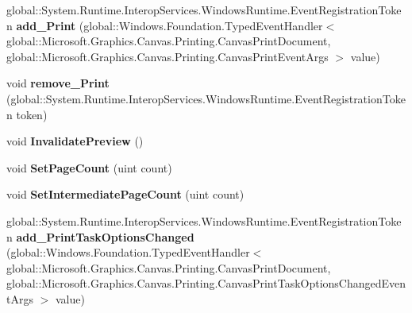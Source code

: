 \begin{DoxyCompactItemize}
\item 
\mbox{\label{interface_microsoft_1_1_graphics_1_1_canvas_1_1_printing_1_1_i_canvas_print_document_a4a78f4b715e692c620d4548df21d5ac0}} 
global\+::\+System.\+Runtime.\+Interop\+Services.\+Windows\+Runtime.\+Event\+Registration\+Token {\bfseries add\+\_\+\+Print} (global\+::\+Windows.\+Foundation.\+Typed\+Event\+Handler$<$ global\+::\+Microsoft.\+Graphics.\+Canvas.\+Printing.\+Canvas\+Print\+Document, global\+::\+Microsoft.\+Graphics.\+Canvas.\+Printing.\+Canvas\+Print\+Event\+Args $>$ value)
\item 
\mbox{\label{interface_microsoft_1_1_graphics_1_1_canvas_1_1_printing_1_1_i_canvas_print_document_a6c6e9590103da951592e47820ae53fdb}} 
void {\bfseries remove\+\_\+\+Print} (global\+::\+System.\+Runtime.\+Interop\+Services.\+Windows\+Runtime.\+Event\+Registration\+Token token)
\item 
\mbox{\label{interface_microsoft_1_1_graphics_1_1_canvas_1_1_printing_1_1_i_canvas_print_document_a6624a11a39bdacc1332f7370fe4e289a}} 
void {\bfseries Invalidate\+Preview} ()
\item 
\mbox{\label{interface_microsoft_1_1_graphics_1_1_canvas_1_1_printing_1_1_i_canvas_print_document_a27ce0b5fa1108240d85779236c1ab571}} 
void {\bfseries Set\+Page\+Count} (uint count)
\item 
\mbox{\label{interface_microsoft_1_1_graphics_1_1_canvas_1_1_printing_1_1_i_canvas_print_document_a7f760cb71cc746fd247a12e55ba416a1}} 
void {\bfseries Set\+Intermediate\+Page\+Count} (uint count)
\item 
\mbox{\label{interface_microsoft_1_1_graphics_1_1_canvas_1_1_printing_1_1_i_canvas_print_document_a1de4b2e4a0bbe65d5a50f8cfd5b275ff}} 
global\+::\+System.\+Runtime.\+Interop\+Services.\+Windows\+Runtime.\+Event\+Registration\+Token {\bfseries add\+\_\+\+Print\+Task\+Options\+Changed} (global\+::\+Windows.\+Foundation.\+Typed\+Event\+Handler$<$ global\+::\+Microsoft.\+Graphics.\+Canvas.\+Printing.\+Canvas\+Print\+Document, global\+::\+Microsoft.\+Graphics.\+Canvas.\+Printing.\+Canvas\+Print\+Task\+Options\+Changed\+Event\+Args $>$ value)

\end{DoxyCompactItemize}

